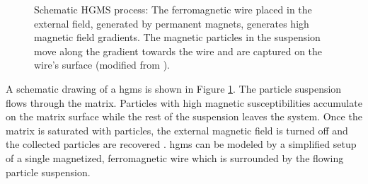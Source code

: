 \begin{figure}[H]
\centering

\caption[Schematic HGMS process]{Schematic HGMS process: The ferromagnetic wire placed in the external field, generated by permanent magnets, generates high magnetic field gradients. The magnetic particles in the suspension move along the gradient towards the wire and are captured on the wire's surface (modified from \cite{FranzrebHabil}).  
\label{fig:hgms}
}
\end{figure}

A schematic drawing of a \gls{hgms} is shown in Figure \ref{fig:hgms}. The particle suspension flows through the matrix. Particles with high magnetic susceptibilities accumulate on the matrix surface while the rest of the suspension leaves the system. Once the matrix is saturated with particles, the external magnetic field is turned off and the collected particles are recovered \cite{svoboda2004magnetic,gerber1983high,ditsch2005high}. \gls{hgms} can be modeled by a simplified setup of a single magnetized, ferromagnetic wire which is surrounded by the flowing particle suspension. %

